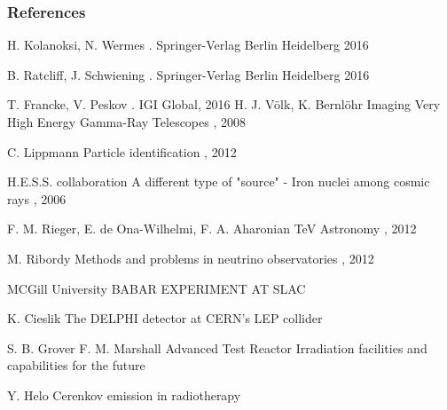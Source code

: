 \documentclass[aspectratio=1610, 10pt]{beamer}
\begin{document}
\begin{frame}[allowframebreaks]
        \frametitle{References}
        
     \begin{thebibliography}{10}
        \beamertemplatebookbibitems
          H. Kolanoksi, N. Wermes
          .
          \newblock  Springer-Verlag Berlin Heidelberg 2016

          B. Ratcliff, J. Schwiening
          .
          \newblock  Springer-Verlag Berlin Heidelberg 2016

          T. Francke, V. Peskov
          .
          \newblock  IGI Global, 2016
          \beamertemplatearticlebibitems
            H. J. Völk, K. Bernlöhr
            \newblock Imaging Very High Energy Gamma-Ray Telescopes
            , 2008

            C. Lippmann
            \newblock Particle identification
            , 2012

             H.E.S.S. collaboration
            \newblock A different type of "source" - Iron nuclei among cosmic rays
            , 2006

             F. M. Rieger, E. de Ona-Wilhelmi, F. A. Aharonian
            \newblock TeV Astronomy
            , 2012

             M. Ribordy
            \newblock Methods and problems in neutrino observatories
            , 2012

            MCGill University
            \newblock  BABAR EXPERIMENT AT SLAC

            K. Cieslik
            \newblock  The DELPHI detector at CERN's LEP collider

            S. B. Grover F. M. Marshall
            \newblock  Advanced Test Reactor Irradiation facilities and capabilities for the future

            Y. Helo
            \newblock  Cerenkov emission in radiotherapy
      \end{thebibliography}
\end{frame}
\end{document}
